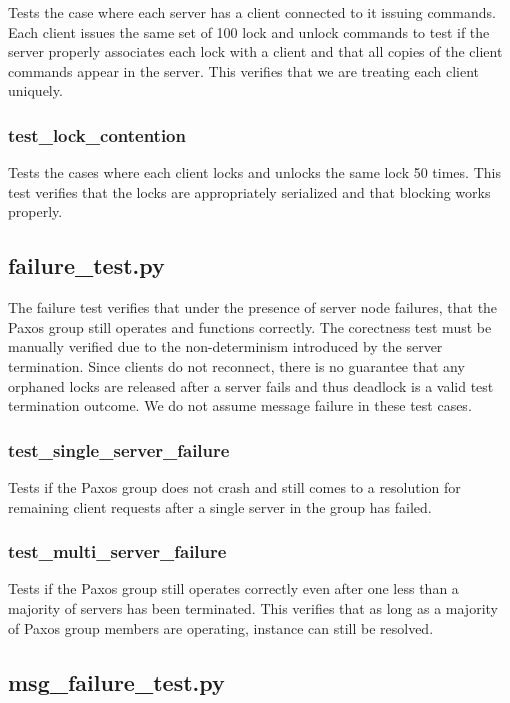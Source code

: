 \documentclass{article}
\begin{document}
Tests the case where each server has a client connected to it issuing commands.
Each client issues the same set of 100 lock and unlock commands to test if the server properly associates each lock with a client and that all copies of the client commands appear in the server.
This verifies that we are treating each client uniquely.

\subsubsection{test\_lock\_contention}

Tests the cases where each client locks and unlocks the same lock 50 times.
This test verifies that the locks are appropriately serialized and that blocking works properly.

\subsection{failure\_test.py}

The failure test verifies that under the presence of server node failures, that the Paxos group still operates and functions correctly.
The corectness test must be manually verified due to the non-determinism introduced by the server termination.
Since clients do not reconnect, there is no guarantee that any orphaned locks are released after a server fails and thus deadlock is a valid test termination outcome.
We do not assume message failure in these test cases.

\subsubsection{test\_single\_server\_failure}

Tests if the Paxos group does not crash and still comes to a resolution for remaining client requests after a single server in the group has failed.

\subsubsection{test\_multi\_server\_failure}

Tests if the Paxos group still operates correctly even after one less than a majority of servers has been terminated.
This verifies that as long as a majority of Paxos group members are operating, instance can still be resolved.

\subsection{msg\_failure\_test.py}
\end{document}
